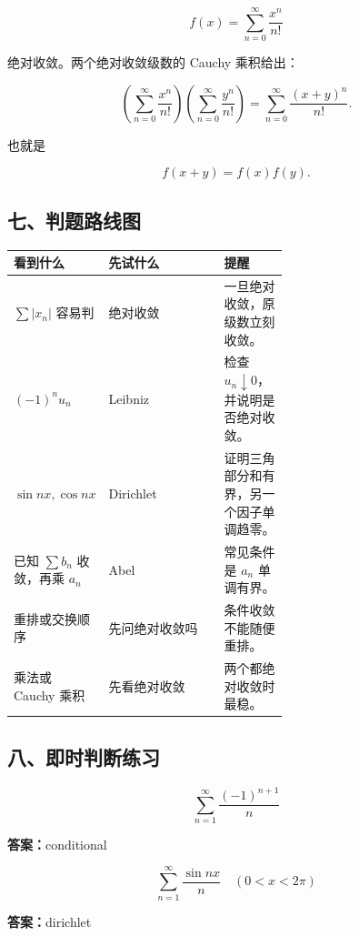 \[
      f(x)=\sum_{n=0}^{\infty}\frac{x^n}{n!}
    \]

绝对收敛。两个绝对收敛级数的 Cauchy 乘积给出：

\[
      \left(\sum_{n=0}^{\infty}\frac{x^n}{n!}\right)
      \left(\sum_{n=0}^{\infty}\frac{y^n}{n!}\right)
      =
      \sum_{n=0}^{\infty}\frac{(x+y)^n}{n!}.
    \]

也就是

\[
      f(x+y)=f(x)f(y).
    \]

\subsection*{七、判题路线图}

\begin{center}
\small
\begin{tabularx}{\linewidth}{|>{\raggedright\arraybackslash}p{0.18\linewidth}|>{\raggedright\arraybackslash}p{0.42\linewidth}|>{\raggedright\arraybackslash}X|}
\hline
\textbf{看到什么} & \textbf{先试什么} & \textbf{提醒} \\ \hline
\(\sum |x_n|\) 容易判 & 绝对收敛 & 一旦绝对收敛，原级数立刻收敛。 \\ \hline
\((-1)^n u_n\) & Leibniz & 检查 \(u_n\downarrow0\)，并说明是否绝对收敛。 \\ \hline
\(\sin nx,\cos nx\) & Dirichlet & 证明三角部分和有界，另一个因子单调趋零。 \\ \hline
已知 \(\sum b_n\) 收敛，再乘 \(a_n\) & Abel & 常见条件是 \(a_n\) 单调有界。 \\ \hline
重排或交换顺序 & 先问绝对收敛吗 & 条件收敛不能随便重排。 \\ \hline
乘法或 Cauchy 乘积 & 先看绝对收敛 & 两个都绝对收敛时最稳。 \\ \hline
\end{tabularx}
\end{center}

\subsection*{八、即时判断练习}

\begin{quickcheck}
\[
          \sum_{n=1}^{\infty}\frac{(-1)^{n+1}}{n}
        \]

\tcblower
\textbf{答案：}conditional
\end{quickcheck}

\begin{quickcheck}
\[
          \sum_{n=1}^{\infty}\frac{\sin nx}{n}\quad(0<x<2\pi)
        \]

\tcblower
\textbf{答案：}dirichlet
\end{quickcheck}

